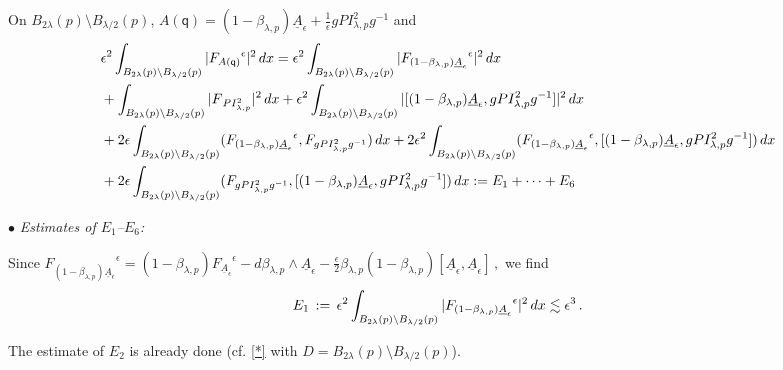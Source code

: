 \documentclass[11pt]{article}
\numberwithin{equation}{section} \setlength{\topmargin}{-35pt}
\newcommand{\q}{\mathsf{q}}
\begin{document}
\noindent On $B_{2\lambda}(p)\setminus B_{\lambda/2}(p)$,
$A(\q)=(1-\beta_{\lambda,p})\underline{A}_{\epsilon}+\frac{1}{\epsilon}gPI^2_{\lambda,p}g^{-1}$
and
\begin{align}
\label{YM2} & \epsilon^2\int_{B_{2\lambda}(p)\setminus
B_{\lambda/2}(p)}|{F_{A(\q)}}^{\epsilon}|^2\,dx =\epsilon^2
\int_{B_{2\lambda}(p)\setminus B_{\lambda/2}(p)}
|{F_{(1-\beta_{\lambda,p})\underline{A}_{\epsilon}}}^{\epsilon}|^2 \,dx\notag\\
&+ \int_{B_{2\lambda}(p)\setminus
B_{\lambda/2}(p)}|F_{\,PI^2_{\lambda,p}}|^2\,dx
+\epsilon^2\int_{B_{2\lambda}(p)\setminus B_{\lambda/2}(p)}|[(1-\beta_{\lambda,p})\underline{A}_{\epsilon} , gPI^2_{\lambda,p}g^{-1}]|^2\,dx\notag\\
&+2\epsilon\int_{B_{2\lambda}(p)\setminus
B_{\lambda/2}(p)}({F_{(1-\beta_{\lambda,p})\underline{A}_{\epsilon}}}^{\epsilon},F_{gPI^2_{\lambda,p}g^{-1}})\,dx+
 2\epsilon^2 \int_{B_{2\lambda}(p)\setminus B_{\lambda/2}(p)}({F_{(1-\beta_{\lambda,p})\underline{A}_{\epsilon}}}^{\epsilon},[(1-\beta_{\lambda,p})\underline{A}_{\epsilon},
gPI^2_{\lambda,p}g^{-1}])\,dx\notag\\
&+2\epsilon\int_{B_{2\lambda}(p)\setminus
B_{\lambda/2}(p)}(F_{gPI^2_{\lambda,p}g^{-1}},[(1-\beta_{\lambda,p})\underline{A}_{\epsilon},
 gPI^2_{\lambda,p}g^{-1}])\,dx:= E_1 + \cdots +
 E_6\notag\\
\end{align}


\medskip

\noindent $\bullet$ \emph{Estimates of $E_1$--$E_6$:}

\noindent Since
${F_{(1-\beta_{\lambda,p})\underline{A}_{\epsilon}}}^{\epsilon}=(1-\beta_{\lambda,p})
{F_{\underline{A}_{\epsilon}}}^{\epsilon}-d\beta_{\lambda,p}\wedge\underline{A}_{\epsilon}-
\frac{\epsilon}{2}\beta_{\lambda,p}(1-\beta_{\lambda,p})[\underline{A}_{\epsilon},\underline{A}_{\epsilon}]\,,$
we find
\begin{equation}
\notag E_1 \,:=\,\epsilon^2\int_{B_{2\lambda}(p)\setminus
B_{\lambda/2}(p)}|{F_{(1-\beta_{\lambda,p})\underline{A}_{\epsilon}}}^{\epsilon}|^2\,dx\lesssim\epsilon^3\,.
\end{equation}


\noindent The estimate of $E_2$ is already done (cf. \eqref{*} with
$D= B_{2\lambda}(p)\setminus B_{\lambda/2}(p)$).
\end{document}
